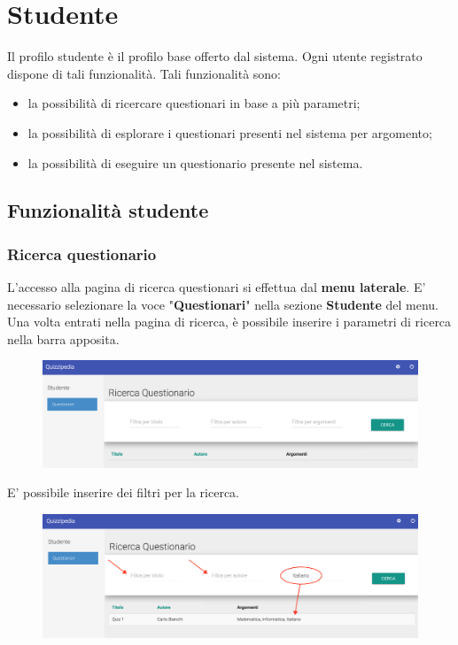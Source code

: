 \documentclass[12pt,a4paper]{article}
\begin{document}
	\newpage

	\section{Studente}\label{studente}
	Il profilo studente è il profilo  base offerto dal sistema. Ogni utente registrato dispone di tali funzionalità. Tali funzionalità sono:
	\begin{itemize}
		\item la possibilità di ricercare questionari in base a più parametri;
		\item la possibilità di esplorare i questionari presenti nel sistema per argomento;
		\item la possibilità di eseguire un questionario presente nel sistema.
	\end{itemize}
	
	\subsection{Funzionalità studente}
	\subsubsection{Ricerca questionario}\label{ricerca_questionario}
	L'accesso alla pagina di ricerca questionari si effettua dal \textbf{menu laterale}. 
	E' necessario selezionare la voce "\textbf{Questionari}" nella sezione \textbf{Studente} del menu.
	Una volta entrati nella pagina di ricerca, è possibile inserire i parametri di ricerca nella barra apposita.
	
	\begin{figure}[H]	
		\centering
		\includegraphics[width=1.0\linewidth]{../img/screenshot/ricercaQuestionario.png}
		\caption{}
		\label{Ricerca questionario}
	\end{figure}
	
	E' possibile inserire dei filtri per la ricerca. 
	
	\begin{figure}[H]		
		\centering
		\includegraphics[width=1.0\linewidth]{../img/screenshot/filtriRicerca.png}
		\caption{}
		\label{Ricerca questionario con filtri}
	\end{figure}
	
\end{document}
